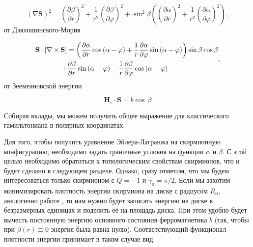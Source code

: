 \documentclass[a4paper,article,14pt]{extarticle}
\begin{document}
\begin{equation}
\label{eq:ExchClass}
 {\left( {\nabla {\mathbf{S}}} \right)^2} = {\left( {\frac{{\partial \beta }}{{\partial r}}} \right)^2} + \frac{1}{{{r^2}}}{\left( {\frac{{\partial \beta }}{{\partial \varphi }}} \right)^2} + {\sin ^2}\beta \left( {{{\left( {\frac{{\partial \alpha }}{{\partial r}}} \right)}^2} + \frac{1}{{{r^2}}}{{\left( {\frac{{\partial \alpha }}{{\partial \varphi }}} \right)}^2}} \right),
\end{equation}
от Дзялошинского-Мория

\begin{equation}
\label{eq:DMclass}
\begin{gathered}
  {\mathbf{S}} \cdot \left[ {\nabla  \times {\mathbf{S}}} \right] = \left( {\frac{{\partial \alpha }}{{\partial r}}\cos \left( {\alpha  - \varphi } \right) + \frac{1}{r}\frac{{\partial \alpha }}{{\partial \varphi }}\sin \left( {\alpha  - \varphi } \right)} \right)\sin \beta \cos \beta  \hfill \\
  \,\,\,\,\,\,\,\,\,\,\,\,\,\,\,\,\,\,\,\,\,\,\, + \frac{{\partial \beta }}{{\partial r}}\sin \left( {\alpha  - \varphi } \right) - \frac{1}{r}\frac{{\partial \beta }}{{\partial \varphi }}\cos \left( {\alpha  - \varphi } \right) \hfill \\ 
\end{gathered},
\end{equation}
от Зеемеановской энергии

\begin{equation}
\label{eq:ExtClass}
{\mathbf{H}_e} \cdot {\mathbf{S}} =  b \cos \, \beta 
\end{equation}

Собирая вклады, мы можем получить общее выражение для классического гамильтониана в полярных координатах. 

Для того, чтобы получить уравнение Эйлера-Лагранжа на скирмионную конфигурацию, необходимо задать граничные условия на функции $\alpha$ и $\beta$. С этой целью необходимо обратиться к топологическим свойствам скирмионов, что и будет сделано в следующем разделе. Однако, сразу отметим, что мы будем интересоваться только скирмионом с $Q=-1$ и $\gamma_0=\pi/2$. Если мы захотим минимизировать плотность энергии скирмиона на диске с радиусом $R_0$, аналогично работе \cite{bogdanov}, то нам нужно будет записать энергию на диске в безразмерных единицах и поделить её на площадь диска. При этом удобно будет вычесть постоянную энергию основного состояния ферромагнетика $b$ (так, чтобы при $\beta \left( r \right) \equiv 0$ энергия была равна нулю). Соответствующий функционал плотности энергии принимает в таком случае  вид
\end{document}
